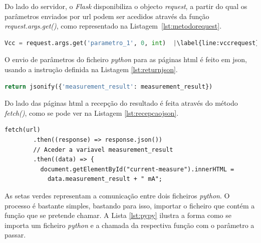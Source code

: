 Do lado do servidor, o \textit{Flask} disponibiliza o objecto \textit{request}, a partir do qual os parâmetros enviados por \acrshort{url} podem ser acedidos através da função \textit{request.args.get()}, como representado na Listagem~\ref{lst:metodorequest}.

\begin{minipage}{0.9\linewidth}
	\begin{lstlisting}[language=python, escapechar=|, caption=Recepção de parâmetros, label=lst:metodorequest]
		Vcc = request.args.get('parametro_1', 0, int)  |\label{line:vccrequest}|
	\end{lstlisting}
\end{minipage}

O envio de parâmetros do ficheiro \textit{python} para as páginas \acrshort{html} é feito em \acrfull{json}, usando a instrução definida na Listagem \ref{lst:returnjson}.

\begin{minipage}{0.9\linewidth}
	\begin{lstlisting}[language=python, escapechar=|, caption=Envio de parâmetros \textit{views.py} $\rightarrow$ \acrshort{html}, label=lst:returnjson]
		return jsonify({'measurement_result': measurement_result})
	\end{lstlisting}
\end{minipage}

Do lado das páginas \acrshort{html} a recepção do resultado é feita através do método \textit{fetch()}, como se pode ver na Listagem \ref{lst:recepcaojson}.

\begin{minipage}{0.9\linewidth}
	\begin{lstlisting}[language=html, escapechar=|, caption=Recepção de parâmetros, label=lst:recepcaojson]
		fetch(url)
		.then((response) => response.json())
		// Aceder a variavel measurement_result
		.then((data) => {
		  document.getElementById("current-measure").innerHTML = 
		  	data.measurement_result + " mA";	
		\end{lstlisting}
\end{minipage}

As setas verdes representam a comunicação entre dois ficheiros \textit{python}. O processo é bastante simples, bastando para isso, importar o ficheiro que contém a função que se pretende chamar. A Lista \ref{lst:pypy} ilustra a forma como se importa um ficheiro \textit{python} e a chamada da respectiva função com o parâmetro a passar.

